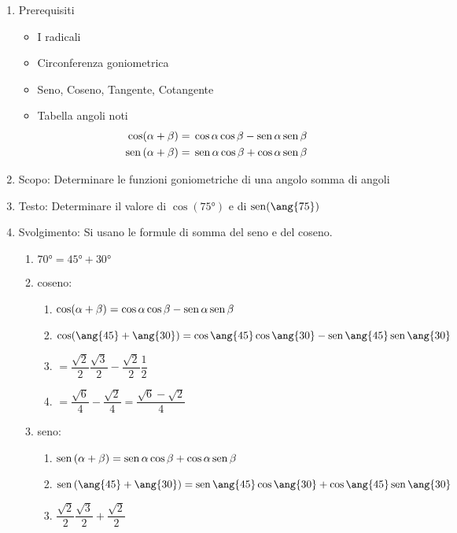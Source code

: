 {\begin{table}[H]
	\begin{enumerate}
		\item Prerequisiti 
		\begin{itemize}
			\item I radicali
			\item Circonferenza goniometrica
			\item Seno, Coseno, Tangente, Cotangente
			\item Tabella angoli noti
			\begin {align*}
			\cos(\alpha+\beta)=	{}&\cos\alpha\cos\beta-\operatorname{sen}\alpha\operatorname{sen}\beta \\ 
			\operatorname{sen}\left(\alpha+\beta\right)={}&\operatorname{sen}\alpha\cos\beta+\cos\alpha\operatorname{sen}\beta
		\end{align*}
	\end{itemize}
	\item Scopo: Determinare le funzioni goniometriche di una angolo somma di angoli
	\item Testo: Determinare il valore di $\cos(\ang{75})$ e di $\sen(\ang{75})$
	\item Svolgimento: Si usano le formule di somma  del seno e del coseno.
	\begin{enumerate}
		\item $\ang{70}=\ang{45}+\ang{30}$
		\item coseno:
		\begin{enumerate}
			\item $\cos(\alpha+\beta)=\cos\alpha\cos\beta-\operatorname{sen}\alpha\operatorname{sen}\beta$
			\item $\cos(\ang{45}+\ang{30})=\cos\ang{45}\cos\ang{30}-\sen\ang{45}\sen\ang{30}$
			\item $=\dfrac{\sqrt{2}}{2}\dfrac{\sqrt{3}}{2}-\dfrac{\sqrt{2}}{2}\dfrac{1}{2}$
			\item $=\dfrac{\sqrt{6}}{4}-\dfrac{\sqrt{2}}{4}=\dfrac{\sqrt{6}-\sqrt{2}}{4}$
		\end{enumerate}
		\item seno:
		\begin{enumerate}
			\item $\operatorname{sen}\left(\alpha+\beta\right)=\operatorname{sen}\alpha\cos\beta+\cos\alpha\operatorname{sen}\beta$
			\item $\sen\left(\ang{45}+\ang{30}\right)=\sen\ang{45} \cos\ang{30}+\cos\ang{45}\sen\ang{30} $
			\item $\dfrac{\sqrt{2}}{2}\dfrac{\sqrt{3}}{2}+\dfrac{\sqrt{2}}{2}$

\end{enumerate}
\end{enumerate}
\end{enumerate}
\end{table}}
